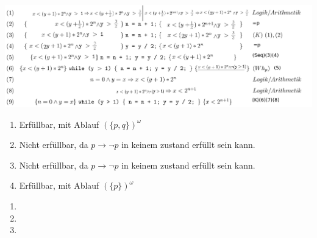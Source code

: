 


\date{Donnerstag 16.1.2020}


\maketitle
\thispagestyle{fancy}

\begin{center}
	\includegraphics[width=1\textwidth]{a1.png}
\end{center}


\begin{enumerate}[1.]
	\item Erfüllbar, mit Ablauf $(\{p,q\})^\omega$
	\item Nicht erfüllbar, da $p \to \lnot p$ in keinem zustand erfüllt sein kann.
	\item Nicht erfüllbar, da $p \to \lnot p$ in keinem zustand erfüllt sein kann.
	\item Erfüllbar, mit Ablauf $(\{p\})^\omega$
\end{enumerate}


\begin{enumerate}[1.]
	\item 
	\item 
	\item 
\end{enumerate}


